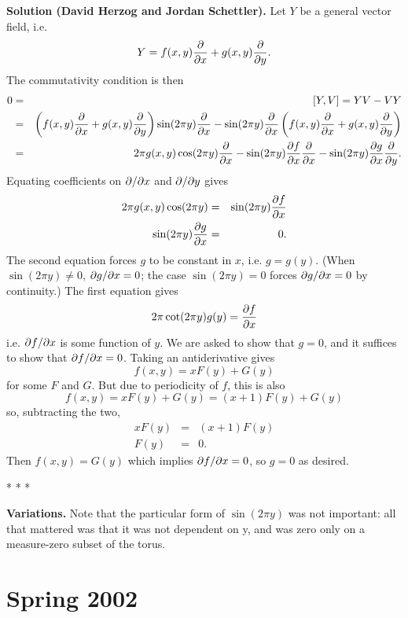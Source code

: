 \documentclass[10pt]{article}
\numberwithin{equation}{subsection}
\begin{document}
\textbf{Solution (David Herzog and Jordan Schettler).}  Let $Y$ be a general
vector field, i.e.
$$
	Y = f(x,y) \frac{\partial}{\partial x} + g(x,y) \frac{\partial}{\partial y}.
$$
The commutativity condition is then
\begin{eqnarray*}
	0 &=& [Y,V] = YV-VY \\
	&=& \left(f(x,y) \frac{\partial}{\partial x} + g(x,y) \frac{\partial}{\partial y}\right) \sin(2\pi y)\frac{\partial}{\partial x}
	-   \sin(2\pi y)\frac{\partial}{\partial x}  \left(f(x,y) \frac{\partial}{\partial x} + g(x,y) \frac{\partial}{\partial y}\right) \\
	&=& 2 \pi g(x,y) \cos(2\pi y)\frac{\partial}{\partial x}
	-   \sin(2\pi y) \frac{\partial f}{\partial x} \frac{\partial}{\partial x}
	-   \sin(2\pi y) \frac{\partial g}{\partial x} \frac{\partial}{\partial y}.
\end{eqnarray*}
Equating coefficients on $\partial/\partial x$ and $\partial/\partial y$ gives
\begin{eqnarray*}
	2 \pi g(x,y) \cos(2\pi y) &=& \sin(2\pi y) \frac{\partial f}{\partial x} \\
	\sin(2\pi y) \frac{\partial g}{\partial x} &=& 0.
\end{eqnarray*}
The second equation forces $g$ to be constant in $x$, i.e. $g=g(y)$.  (When
$\sin(2\pi y) \ne 0$, $\partial g/\partial x = 0$; the case $\sin(2\pi y)=0$ forces
$\partial g/\partial x=0$ by continuity.)
The first equation gives
$$
	2 \pi\cot(2\pi y) g(y) = \frac{\partial f}{\partial x}
$$
i.e. $\partial f/\partial x$ is some function of $y$.  We are asked to show that $g=0$, and
it suffices to show that $\partial f/\partial x = 0$.  Taking an antiderivative gives
$$
	f(x,y) = x F(y) + G(y)
$$
for some $F$ and $G$.  But due to periodicity of $f$, this is also
$$
	f(x,y) = x F(y) + G(y) = (x+1) F(y) + G(y)
$$
so, subtracting the two,
\begin{eqnarray*}
	x F(y) &=& (x+1) F(y) \\
	F(y) &=& 0.
\end{eqnarray*}
Then $f(x,y) = G(y)$ which implies $\partial f/\partial x = 0$, so $g=0$ as desired.

\begin{center}* * *\end{center}

\textbf{Variations.}  Note that the particular form of $\sin(2\pi y)$ was not
important:  all that mattered was that it was not dependent on y, and was zero
only on a measure-zero subset of the torus.

\newpage
\section{Spring 2002}

\end{document}
